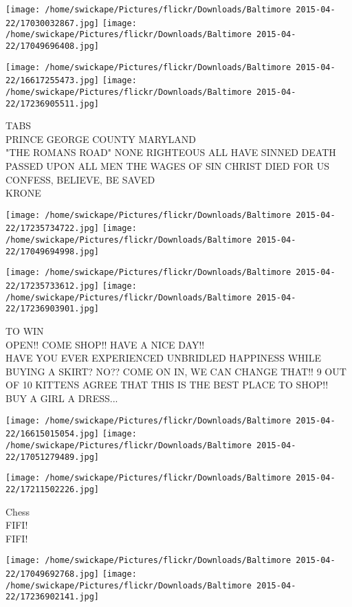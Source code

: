 \documentclass[10pt,letterpaper]{article}
\begin{document}
\texttt{[image: /home/swickape/Pictures/flickr/Downloads/Baltimore 2015-04-22/17030032867.jpg]}
\texttt{[image: /home/swickape/Pictures/flickr/Downloads/Baltimore 2015-04-22/17049696408.jpg]}

\texttt{[image: /home/swickape/Pictures/flickr/Downloads/Baltimore 2015-04-22/16617255473.jpg]}
\texttt{[image: /home/swickape/Pictures/flickr/Downloads/Baltimore 2015-04-22/17236905511.jpg]}

TABS\\
PRINCE GEORGE COUNTY MARYLAND\\
"THE ROMANS ROAD" NONE RIGHTEOUS ALL HAVE SINNED DEATH PASSED UPON ALL MEN THE WAGES OF SIN CHRIST DIED FOR US CONFESS, BELIEVE, BE SAVED\\
KRONE\\
\pagebreak

\texttt{[image: /home/swickape/Pictures/flickr/Downloads/Baltimore 2015-04-22/17235734722.jpg]}
\texttt{[image: /home/swickape/Pictures/flickr/Downloads/Baltimore 2015-04-22/17049694998.jpg]}

\texttt{[image: /home/swickape/Pictures/flickr/Downloads/Baltimore 2015-04-22/17235733612.jpg]}
\texttt{[image: /home/swickape/Pictures/flickr/Downloads/Baltimore 2015-04-22/17236903901.jpg]}

TO WIN\\
OPEN!!  COME SHOP!!  HAVE A NICE DAY!!\\
HAVE YOU EVER EXPERIENCED UNBRIDLED HAPPINESS WHILE BUYING A SKIRT?  NO??  COME ON IN, WE CAN CHANGE THAT!!  9 OUT OF 10 KITTENS AGREE THAT THIS IS THE BEST PLACE TO SHOP!!\\
BUY A GIRL A DRESS...\\
\pagebreak

\texttt{[image: /home/swickape/Pictures/flickr/Downloads/Baltimore 2015-04-22/16615015054.jpg]}
\texttt{[image: /home/swickape/Pictures/flickr/Downloads/Baltimore 2015-04-22/17051279489.jpg]}

\vspace{0.25in}
\texttt{[image: /home/swickape/Pictures/flickr/Downloads/Baltimore 2015-04-22/17211502226.jpg]}

Chess\\
FIFI!\\
FIFI!\\
\pagebreak

\texttt{[image: /home/swickape/Pictures/flickr/Downloads/Baltimore 2015-04-22/17049692768.jpg]}
\texttt{[image: /home/swickape/Pictures/flickr/Downloads/Baltimore 2015-04-22/17236902141.jpg]}
\end{document}
